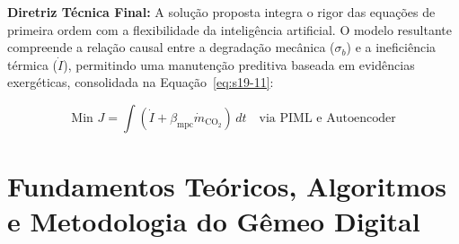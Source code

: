 \documentclass[12pt,a4paper]{article}
\numberwithin{equation}{section}
\numberwithin{table}{section}
\numberwithin{figure}{section}
\begin{document}
{\textbf{Diretriz Técnica Final:} A solução proposta integra o rigor das equações de primeira ordem com a flexibilidade da inteligência artificial. O modelo resultante compreende a relação causal entre a degradação mecânica ($\sigma_b$) e a ineficiência térmica ($\dot{I}$), permitindo uma manutenção preditiva baseada em evidências exergéticas, consolidada na Equação~\eqref{eq:s19-11}:

\begin{equation}\label{eq:s19-11}
\boxed{\text{Min } J = \int (\dot{I} + \beta_{\text{mpc}} \dot{m}_{\text{CO}_2}) \, dt \quad \text{via PIML e Autoencoder}}
\end{equation}

	\clearpage
	\section{Fundamentos Teóricos, Algoritmos e Metodologia do Gêmeo Digital}

}
\end{document}

